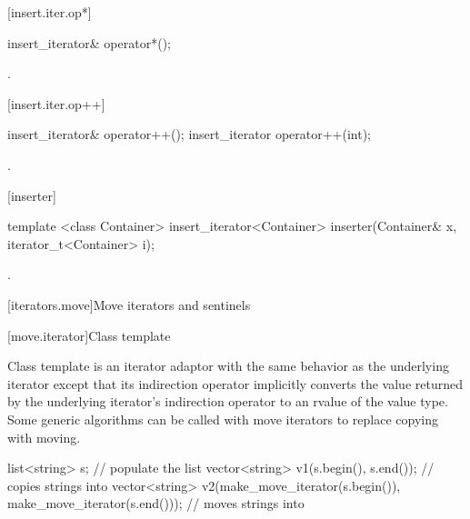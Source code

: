[insert.iter.op*]{}

%
\begin{itemdecl}
insert_iterator& operator*();
\end{itemdecl}

\begin{itemdescr}
\pnum
\returns
{}.
\end{itemdescr}

[insert.iter.op++]{}

%
\begin{itemdecl}
insert_iterator& operator++();
insert_iterator operator++(int);
\end{itemdecl}

\begin{itemdescr}
\pnum
\returns
{}.
\end{itemdescr}

[inserter]{}

%
\begin{itemdecl}
template <class Container>
  insert_iterator<Container> inserter(Container& x, iterator_t<Container> i);
\end{itemdecl}

\begin{itemdescr}
\pnum
\returns
{}.
\end{itemdescr}

[iterators.move]{Move iterators and sentinels}

[move.iterator]{Class template }

\pnum
Class template  is an iterator adaptor
with the same behavior as the underlying iterator except that its
indirection operator implicitly converts the value returned by the
underlying iterator's indirection operator to an rvalue
of the value type.
Some generic algorithms can be called with move iterators to replace
copying with moving.

\pnum
\enterexample

\begin{codeblock}
list<string> s;
// populate the list 
vector<string> v1(s.begin(), s.end());          // copies strings into 
vector<string> v2(make_move_iterator(s.begin()),
                  make_move_iterator(s.end())); // moves strings into 
\end{codeblock}

